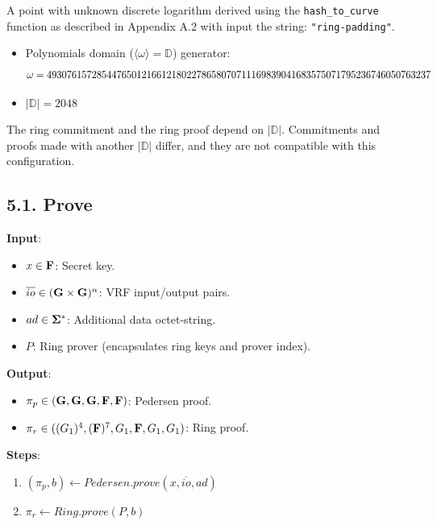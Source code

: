 \documentclass[
]{article}
\providecommand{\tightlist}{%
  \setlength{\itemsep}{0pt}\setlength{\parskip}{0pt}}
\begin{document}
A point with unknown discrete logarithm derived using the
\texttt{hash\_to\_curve} function as described in Appendix A.2 with
input the string: \texttt{"ring-padding"}.

\begin{itemize}
\item
  Polynomials domain (\(\langle \omega \rangle = \mathbb{D}\))
  generator:
  \[\footnotesize \omega = 49307615728544765012166121802278658070711169839041683575071795236746050763237\]
\item
  \(|\mathbb{D}| = 2048\)
\end{itemize}

The ring commitment and the ring proof depend on \(|\mathbb{D}|\).
Commitments and proofs made with another \(|\mathbb{D}|\) differ, and
they are not compatible with this configuration.

\subsection{5.1. Prove}\label{prove-3}

\textbf{Input}:

\begin{itemize}
\tightlist
\item
  \(x \in \bold{F}\): Secret key.
\item
  \(\overline{io} \in (\bold{G}\times \bold{G})^n\): VRF input/output
  pairs.
\item
  \(ad \in \bold{\Sigma}^*\): Additional data octet-string.
\item
  \(P\): Ring prover (encapsulates ring keys and prover index).
\end{itemize}

\textbf{Output}:

\begin{itemize}
\tightlist
\item
  \(\pi_p \in (\bold{G}, \bold{G}, \bold{G}, \bold{F}, \bold{F})\):
  Pedersen proof.
\item
  \(\pi_r \in ((G_1)^4, (\bold{F})^7, G_1, \bold{F}, G_1, G_1)\): Ring
  proof.
\end{itemize}

\textbf{Steps}:

\begin{enumerate}
\def\labelenumi{\arabic{enumi}.}
\tightlist
\item
  \((\pi_p, b) \gets Pedersen.prove(x, \overline{io}, ad)\)
\item
  \(\pi_r \gets Ring.prove(P, b)\)
\end{enumerate}
\end{document}
